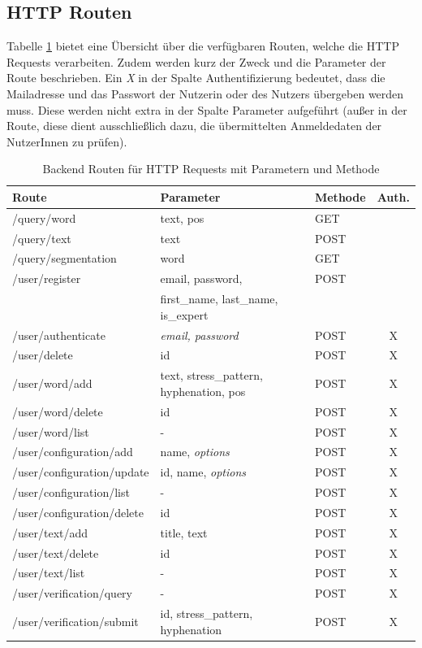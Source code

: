 \subsection{HTTP Routen}
Tabelle \ref{table:backendroutes} bietet eine Übersicht über die verfügbaren Routen, welche die HTTP Requests verarbeiten. Zudem werden kurz der Zweck und die Parameter der Route beschrieben. Ein \textit{X} in der Spalte Authentifizierung bedeutet, dass die Mailadresse und das Passwort der Nutzerin oder des Nutzers übergeben werden muss. Diese werden nicht extra in der Spalte Parameter aufgeführt (außer in der  Route, diese dient ausschließlich dazu, die übermittelten Anmeldedaten der NutzerInnen zu prüfen).

\begin{table}[h!]
	\centering
	\begin{tabular}{|l|l|l|c|}
		\hline
		\textbf{Route} & \textbf{Parameter} & \textbf{Methode} & \textbf{Auth.}\\
		\hline
		\hline
		/query/word & text, pos & GET & \\
		\hline
		/query/text & text & POST & \\
		\hline
		/query/segmentation& word & GET & \\
		\hline
		\hline
		/user/register & email, password, & POST & \\
		& first\_name, last\_name, is\_expert &&\\
		\hline
		/user/authenticate & \textit{email, password} & POST & X\\
		\hline
		/user/delete & id & POST & X\\
		\hline
		\hline
		/user/word/add& text, stress\_pattern, hyphenation, pos & POST & X\\
		\hline
		/user/word/delete& id & POST & X\\
		\hline
		/user/word/list & - & POST & X\\
		\hline
		\hline
		/user/configuration/add & name, \textit{options} & POST & X\\
		\hline
		/user/configuration/update & id, name, \textit{options}  & POST & X\\
		\hline
		/user/configuration/list & - & POST & X\\
		\hline
		/user/configuration/delete & id & POST & X\\
		\hline
		\hline
		/user/text/add & title, text & POST & X\\
		\hline
		/user/text/delete & id & POST & X\\
		\hline
		/user/text/list & - & POST & X\\
		\hline
		\hline
		/user/verification/query & - & POST & X\\
		\hline
		/user/verification/submit & id, stress\_pattern, hyphenation & POST & X\\
		\hline
	\end{tabular}
	\caption{Backend Routen für HTTP Requests mit Parametern und Methode}
	\label{table:backendroutes}
\end{table}

